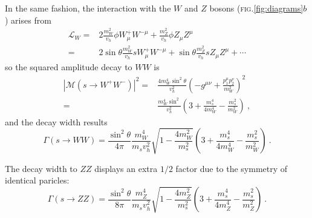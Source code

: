 \documentclass[aps,prd,preprintnumbers,nofootinbibn,twocolumn]{revtex4}
\begin{document}
In the same fashion, the interaction with the $W$ and $Z$ bosons (\textsc{fig.}\ref{fig:diagrams}$b$) arises from
\begin{align}
\mathcal{L}_W =& 2 \frac{m_W^2}{v_h}\phi W^+_\mu W^{-\mu} + \frac{m_Z^2}{v_h} \phi Z_\mu Z^\mu\nonumber\\
=& 2 \sin \theta \frac{m_W^2}{v_h}s W^+_\mu W^{-\mu} + \sin\theta \frac{m_Z^2}{v_h} s Z_\mu Z^\mu + \cdots
\end{align}
so the squared amplitude decay to $WW$ is
\begin{align}
|\mathcal{M}(s\to W^+W^-)|^2 =& \frac{4 m_W^4 \sin^2\theta}{v_h^2} \left(-g^{\mu\nu}+\frac{p^\mu_1 p^\nu_2}{m_W^2} \right)^2\nonumber\\
=&  \frac{m_W^4 \sin^2 }{v_h^2} \left(3+\frac{m_s^4}{4 m_W^4}-\frac{m_s^2}{m_W^2} \right)\ ,
\end{align}
and the decay width results
\begin{equation}
\Gamma(s \rightarrow WW)=  \frac{\sin^2\theta }{4 \pi } \frac{m_W^4}{m_s v_h^2} \sqrt{ 1- \frac{4 m_W^2}{m_s^2}}
\left(3+\frac{m_s^4}{4 m_W^4}-\frac{m_s^2}{m_W^2} \right)\ .
\end{equation}

The decay width to $ZZ$ displays an extra $1/2$ factor due to the symmetry of identical paricles:
\begin{equation}
\Gamma(s \rightarrow ZZ)=  \frac{\sin^2\theta }{8 \pi } \frac{m_Z^4}{m_s v_h^2} \sqrt{ 1- \frac{4 m_Z^2}{m_s^2}}
\left(3+\frac{m_s^4}{4 m_Z^4}-\frac{m_s^2}{m_Z^2} \right)\ .
\end{equation}
\end{document}
